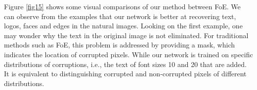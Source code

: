 Figure \ref{fig15} shows some visual comparisons of our method between FoE. We can
observe from the examples that our network is better at recovering text, logos,
faces and edges in the natural images. Looking on the first example, one may wonder
why the text in the original image is not eliminated. For traditional methods
such as FoE, this problem is addressed by providing a mask, which indicates the
location of corrupted pixels. While our network is trained on specific distributions
of corruptions, i.e., the text of font sizes 10 and 20 that are added.
It is equivalent to distinguishing corrupted and non-corrupted pixels of different distributions.

\begin{figure*}
\centering
{}
\caption{Visual results of our method and FoE. Images from left to right are:
Corrupted images, the inpainting results of FoE and the inpainting results of our method. We see better recovered details as shown in the zoomed
patches.}
\label{fig15}
\end{figure*}



